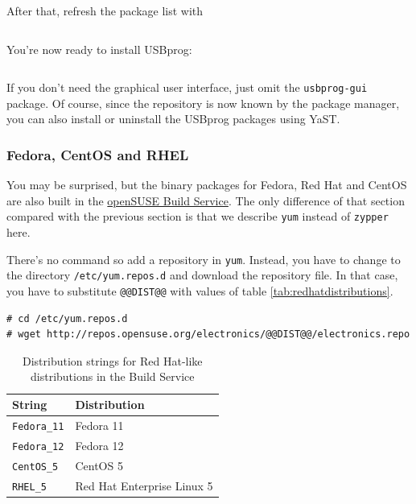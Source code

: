 \documentclass[bibtotoc,UKenglish,halfparskip,oneside,DIV12]{scrreprt}
\begin{document}
After that, refresh the package list with

\begin{lstlisting}[style=inline]
% sudo zypper ref
\end{lstlisting}

You're now ready to install USBprog:

\begin{lstlisting}[style=inline]
% sudo zypper install usbprog usbprog-gui
\end{lstlisting}

If you don't need the graphical user interface, just omit the \texttt{usbprog-gui} package. Of
course, since the repository is now known by the package manager, you can also install or uninstall
the USBprog packages using YaST.

\subsubsection{Fedora, CentOS and RHEL}

You may be surprised, but the binary packages for Fedora, Red Hat and CentOS are also built in the
\href{https://build.opensuse.org/}{openSUSE Build Service}. The only difference of that section
compared with the previous section is that we describe \texttt{yum} instead of \texttt{zypper} here.

There's no command so add a repository in \texttt{yum}. Instead, you have to change to the directory
\texttt{/etc/yum.repos.d} and download the repository file. In that case, you have to substitute
\texttt{@@DIST@@} with values of table \vref{tab:redhatdistributions}.

\begin{lstlisting}[style=inline]
% su
# cd /etc/yum.repos.d
# wget http://repos.opensuse.org/electronics/@@DIST@@/electronics.repo
\end{lstlisting}

\begin{table}[htb]
  \centering
  \begin{tabular}{|p{4cm}p{10cm}|}
    \hline
    \textbf{String}                 & \textbf{Distribution}                               \\
    \hline
    \hline
    \texttt{Fedora\_11}             & Fedora 11                                           \\
    \texttt{Fedora\_12}             & Fedora 12                                           \\
    \texttt{CentOS\_5}              & CentOS 5                                            \\
    \texttt{RHEL\_5}                & Red Hat Enterprise Linux 5                          \\
    \hline
  \end{tabular}
  \caption{Distribution strings for Red Hat-like distributions in the Build Service}
  \label{tab:redhatdistributions}
\end{table}
\end{document}
